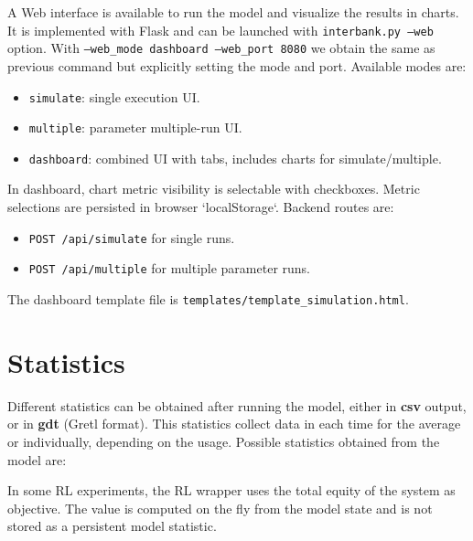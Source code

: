 \documentclass{article}
\begin{document}
A Web interface is available to run the model and visualize the results in charts. It is implemented with Flask and can be launched with \texttt{interbank.py --web} option.
With  \texttt{--web\_mode dashboard --web\_port 8080} we obtain the same as previous command but explicitly setting the mode and port. Available modes are:
\begin{itemize}
    \item \texttt{simulate}: single execution UI.
    \item \texttt{multiple}: parameter multiple-run UI.
    \item \texttt{dashboard}: combined UI with tabs, includes charts for simulate/multiple.
\end{itemize}
In dashboard, chart metric visibility is selectable with checkboxes. Metric selections are persisted in browser `localStorage`.
Backend routes are:
\begin{itemize}
    \item \texttt{POST /api/simulate} for single runs.
    \item \texttt{POST /api/multiple} for multiple parameter runs.
\end{itemize}
The dashboard template file is \texttt{templates/template\_simulation.html}.

\section{Statistics}

Different statistics can be obtained after running the model, either in \textbf{csv} output, or in \textbf{gdt} (Gretl format).
This statistics collect data in each time for the average or individually, depending on the usage. Possible statistics obtained from the model are:

\noindent In some RL experiments, the RL wrapper uses the total equity of the system as objective. The value is computed on the fly from the model state and is not stored as a persistent model statistic.
\end{document}
